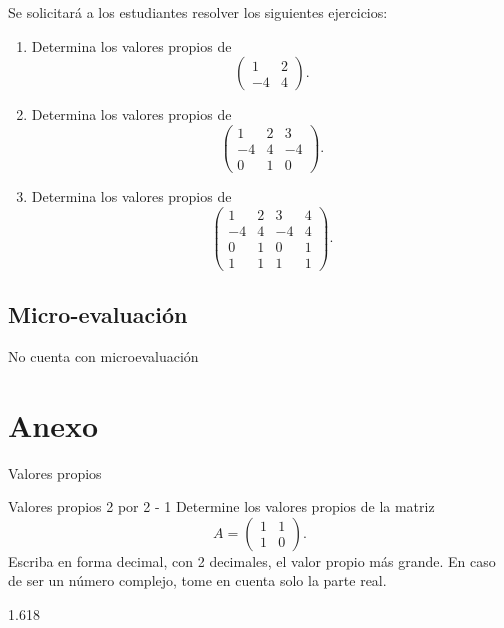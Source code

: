 \documentclass[a4,11pt]{aleph-notas}
\begin{document}
Se solicitará a los estudiantes resolver los siguientes ejercicios:
\begin{enumerate}
    \item 
        Determina los valores propios de
        \[
            \begin{pmatrix}
                1 & 2 \\ -4 & 4
            \end{pmatrix}.
        \]
    \item 
        Determina los valores propios de
        \[
            \begin{pmatrix}
                1 & 2 & 3 \\ -4 & 4 & -4 \\ 0 & 1 & 0
            \end{pmatrix}.
        \]
    \item 
        Determina los valores propios de
        \[
            \begin{pmatrix}
                1 & 2 & 3 & 4 \\ -4 & 4 & -4 & 4 \\ 0 & 1 & 0 & 1 \\ 1 & 1 & 1 & 1
            \end{pmatrix}.
        \]
\end{enumerate}

\subsection{Micro-evaluación}

No cuenta con microevaluación

\section*{Anexo}

\begin{quiz}{Valores propios}

\begin{numerical}[tolerance=0.01]%
    {Valores propios 2 por 2 - 1}
    Determine los valores propios de la matriz
    \[
    A = \begin{pmatrix}
    1 & 1 \\
    1 & 0
    \end{pmatrix}.
    \]
    Escriba en forma decimal, con 2 decimales, el valor propio más grande. En caso de ser un número complejo, tome en cuenta solo la parte real.
    \item[] 1.618
\end{numerical}

\end{quiz}
\end{document}
